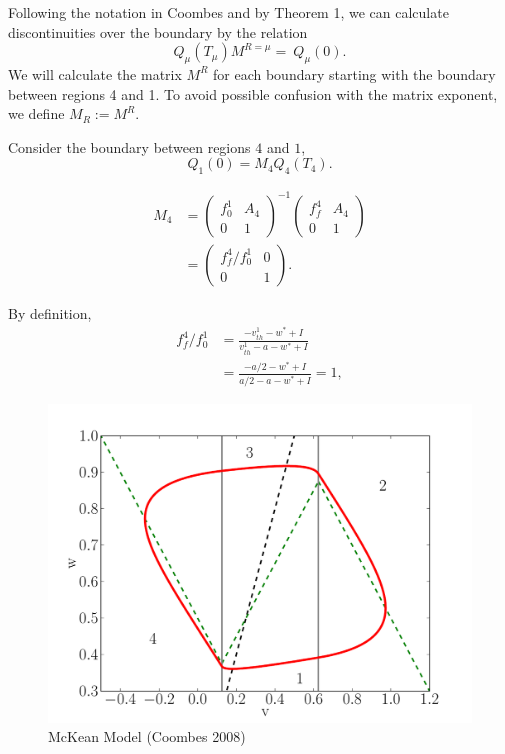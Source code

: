 \documentclass{beamer}
\renewcommand{\matrix}[2]{ \left(\begin{array}{#1} #2 \end{array}\right)}
\begin{document}
\begin{frame}


Following the notation in Coombes and by Theorem 1, we can calculate discontinuities over the boundary by the relation
\begin{equation}
 Q_\mu(T_\mu)M^{R=\mu}= \ Q_\mu(0).
\end{equation}
We will calculate the matrix $M^R$ for each boundary starting with the boundary between regions 4 and 1.  To avoid possible confusion with the matrix exponent, we define $M_R := M^R$.



\end{frame}

\begin{frame}
Consider the boundary between regions $4$ and $1$,
\begin{equation}
 Q_1(0) = M_4 Q_4(T_4).
\end{equation}

\begin{equation}
\begin{split}
 M_4 &= \matrix{cc}{f_0^1 & A_4\\0 & 1}^{-1} \matrix{cc}{f_f^4 & A_4\\0 & 1}\\
 &=\matrix{cc}{f_f^4/f_0^1 & 0\\0 & 1}.
\end{split}
\end{equation}

By definition,
\begin{equation}
\begin{split}
 f_f^4/f_0^1 &= \frac{-v_{th}^1 - w^* + I}{v_{th}^1-a-w^*+I}\\
 &= \frac{-a/2 - w^* + I}{a/2-a-w^*+I} = 1,
\end{split}
\end{equation}

\end{frame}

\begin{frame}
 \begin{figure}
\includegraphics[width=\textwidth]{pmk_fig.pdf}
\caption{McKean Model (Coombes 2008)}\end{figure}
\end{frame}
\end{document}
